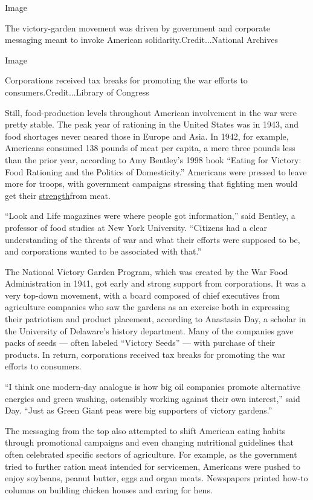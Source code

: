 Image

The victory-garden movement was driven by government and corporate
messaging meant to invoke American solidarity.Credit...National Archives

Image

Corporations received tax breaks for promoting the war efforts to
consumers.Credit...Library of Congress

Still, food-production levels throughout American involvement in the war
were pretty stable. The peak year of rationing in the United States was
in 1943, and food shortages never neared those in Europe and Asia. In
1942, for example, Americans consumed 138 pounds of meat per capita, a
mere three pounds less than the prior year, according to Amy Bentley's
1998 book ``Eating for Victory: Food Rationing and the Politics of
Domesticity.'' Americans were pressed to leave more for troops, with
government campaigns stressing that fighting men would get their
\href{https://books.google.com/books?id=InqSoenmQ0IC\&pg=PA85\&source=gbs_toc_r\&cad=4\#v=onepage\&q=soy\&f=false}{strength}from
meat.

``Look and Life magazines were where people got information,'' said
Bentley, a professor of food studies at New York University. ``Citizens
had a clear understanding of the threats of war and what their efforts
were supposed to be, and corporations wanted to be associated with
that.''

The National Victory Garden Program, which was created by the War Food
Administration in 1941, got early and strong support from corporations.
It was a very top-down movement, with a board composed of chief
executives from agriculture companies who saw the gardens as an exercise
both in expressing their patriotism and product placement, according to
Anastasia Day, a scholar in the University of Delaware's history
department. Many of the companies gave packs of seeds --- often labeled
``Victory Seeds'' --- with purchase of their products. In return,
corporations received tax breaks for promoting the war efforts to
consumers.

``I think one modern-day analogue is how big oil companies promote
alternative energies and green washing, ostensibly working against their
own interest,'' said Day. ``Just as Green Giant peas were big supporters
of victory gardens.''

The messaging from the top also attempted to shift American eating
habits through promotional campaigns and even changing nutritional
guidelines that often celebrated specific sectors of agriculture. For
example, as the government tried to further ration meat intended for
servicemen, Americans were pushed to enjoy soybeans, peanut butter, eggs
and organ meats. Newspapers printed how-to columns on building chicken
houses and caring for hens.

